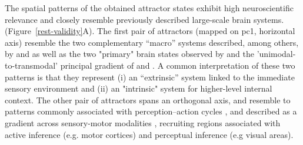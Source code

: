 \documentclass{article}
\begin{document}
The spatial patterns of the obtained attractor states exhibit high neuroscientific relevance and closely resemble previously described large-scale brain systems. (Figure~\ref{rest-validity}A). The first pair of attractors (mapped on \acrshort{pc}1, horizontal axis) resemble the two complementary ``macro'' systems described, among others, by \citet{golland2008data} and \citet{cioli2014differences} as well as the two "primary" brain states observed by \citet{chen2018human} and the 'unimodal-to-transmodal' principal gradient of \citet{margulies2016situating} and \citet{huntenburg2018large}. A common interpretation of these two patterns is that they represent (i) an ``extrinsic'' system linked to the immediate sensory environment and (ii) an "intrinsic" system for higher-level internal context.
The other pair of attractors spans an orthogonal axis, and resemble to patterns commonly associated with perception--action cycles \citep{fuster2004upper}, and described as a gradient across sensory-motor modalities \citep{huntenburg2018large}, recruiting regions associated with active inference (e.g. motor cortices) and perceptual inference (e.g visual areas).
\end{document}
